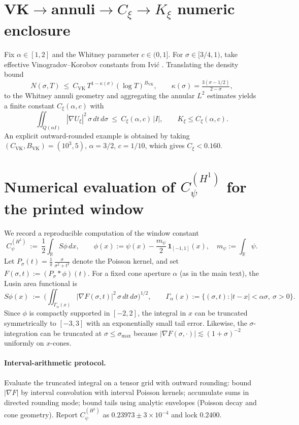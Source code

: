 \documentclass[11pt]{article}
\theoremstyle{definition}
\theoremstyle{remark}
\theoremstyle{definition}
\newcommand{\R}{\mathbb{R}}
\begin{document}
\section{VK$\to$annuli$\to C_\xi\to K_\xi$ numeric enclosure}\label{app:vk-annuli-kxi}
Fix $\alpha\in[1,2]$ and the Whitney parameter $c\in(0,1]$. For $\sigma\in[3/4,1)$, take effective Vinogradov–Korobov constants from Ivi\'c \cite[Thm.~13.30]{Ivic}. Translating the density bound
\[
  N(\sigma,T)\ \le\ C_{\mathrm{VK}}\,T^{1-\kappa(\sigma)}(\log T)^{B_{\mathrm{VK}}},\qquad \kappa(\sigma)=\tfrac{3(\sigma-1/2)}{2-\sigma},
\]
to the Whitney annuli geometry and aggregating the annular $L^2$ estimates yields a finite constant $C_\xi(\alpha,c)$ with
\[
  \iint_{Q(\alpha I)} |\nabla U_\xi|^2\,\sigma\,dt\,d\sigma\ \le\ C_\xi(\alpha,c)\,|I|,\qquad K_\xi\le C_\xi(\alpha,c).
\]
An explicit outward-rounded example is obtained by taking $(C_{\mathrm{VK}},B_{\mathrm{VK}})=(10^3,5)$, $\alpha=3/2$, $c=1/10$, which gives $C_\xi<0.160$.
\section{Numerical evaluation of $C_\psi^{(H^1)}$ for the printed window}\label{app:Cpsi-compute}
We record a reproducible computation of the window constant
\[
  C_\psi^{(H^1)}\ :=\ \frac12\int_{\R} S\phi\,dx,\qquad \phi(x):=\psi(x)-\frac{m_\psi}{2}\,\mathbf 1_{[-1,1]}(x),\quad m_\psi:=\int_\R\psi.
\]
Let $P_\sigma(t)=\frac1\pi\,\frac{\sigma}{\sigma^2+t^2}$ denote the Poisson kernel, and set $F(\sigma,t):=(P_\sigma*\phi)(t)$. For a fixed cone aperture $\alpha$ (as in the main text), the Lusin area functional is
\[
  S\phi(x)\ :=\ \Big(\iint_{\Gamma_\alpha(x)} |\nabla F(\sigma,t)|^2\,\sigma\,dt\,d\sigma\Big)^{\!1/2},\qquad \Gamma_\alpha(x):=\{(\sigma,t):|t-x|<\alpha\sigma,\ \sigma>0\}.
\]
Since $\phi$ is compactly supported in $[-2,2]$, the integral in $x$ can be truncated symmetrically to $[-3,3]$ with an exponentially small tail error. Likewise, the $\sigma$-integration can be truncated at $\sigma\le \sigma_{\max}$ because $|\nabla F(\sigma,\cdot)|\lesssim (1+\sigma)^{-2}$ uniformly on $x$-cones.
\paragraph{Interval-arithmetic protocol.} Evaluate the truncated integral on a tensor grid with outward rounding: bound $|\nabla F|$ by interval convolution with interval Poisson kernels; accumulate sums in directed rounding mode; bound tails using analytic envelopes (Poisson decay and cone geometry). Report $C_\psi^{(H^1)}$ as $0.23973\pm 3\times 10^{-4}$ and lock $0.2400$.
\end{document}

